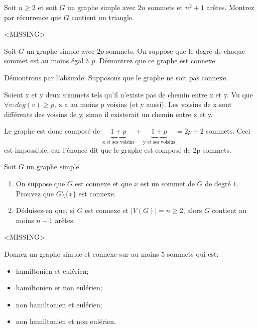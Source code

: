 \begin{exo}
Soit $n\geq 2$ et soit $G$ un graphe simple avec $2n$ sommets et $n^2+1$ ar\^etes. Montrez par récurrence que $G$ contient un triangle.
\end{exo}

<MISSING>


\begin{exo}
Soit $G$ un graphe simple avec $2p$ sommets. On suppose que le degr\'e de chaque sommet est au moins \'egal \`a $p$. D\'emontrez que ce graphe est connexe.
\end{exo}

Démontrons par l'absurde: Supposons que le graphe ne soit pas connexe.

Soient x et y deux sommets tels qu'il n'existe pas de chemin entre x et y. Vu que $\forall v: deg(v)\geq p$, x a au moins p voisins (et y aussi). Les voisins de x sont différents des voisins de y, sinon il existerait un chemin entre x et y.

Le graphe est donc composé de $\underbrace{1+p}_{\text{x et ses voisins}}+\underbrace{1+p}_{\text{y et ses voisins}} = 2p+2$ sommets. Ceci est impossible, car l'énoncé dit que le graphe est composé de 2p sommets.


\begin{exo}
Soit $G$ un graphe simple.
\begin{enumerate}
\item On suppose que $G$ est connexe et que $x$ est un sommet de $G$ de degr\'e $1$. Prouvez que $G\setminus\{x\}$ est connexe.
\item D\'eduisez-en que, si $G$ est connexe et $|V(G)|=n\geq 2$, alors $G$ contient au moins $n-1$ ar\^etes.
\end{enumerate}
\end{exo}

<MISSING>


\begin{exo}
Donnez un graphe simple et connexe sur au moins $5$ sommets qui est:
\begin{itemize}
\item hamiltonien et eul\'erien;
\item hamiltonien et non eul\'erien;
\item non hamiltonien et eul\'erien;
\item non hamiltonien et non eul\'erien.
\end{itemize}
\end{exo}

